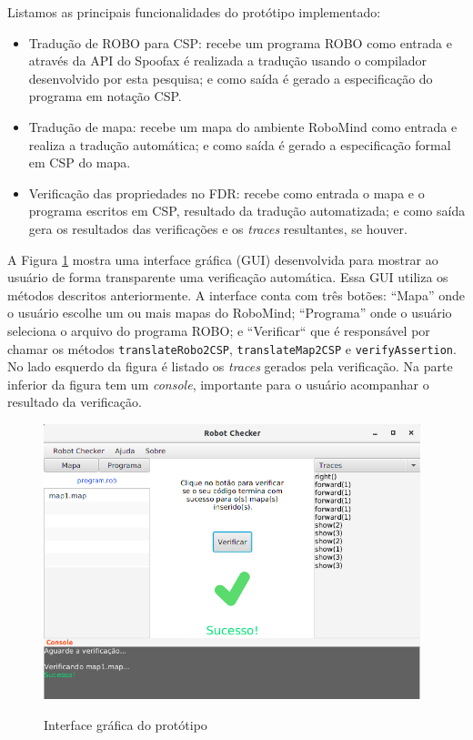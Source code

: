 Listamos as principais funcionalidades do protótipo implementado:

\begin{itemize}
    \item Tradução de ROBO para CSP: recebe um programa ROBO como entrada e através da API do Spoofax é realizada a tradução usando o compilador desenvolvido por esta pesquisa; e como saída é gerado a especificação do programa em notação CSP.
    \item Tradução de mapa: recebe um mapa do ambiente RoboMind como entrada e realiza a tradução automática; e como saída é gerado a especificação formal em CSP do mapa.
    \item Verificação das propriedades no FDR: recebe como entrada o mapa e o programa escritos em CSP, resultado da tradução automatizada; e como saída gera os resultados das verificações e os \textit{traces} resultantes, se houver.
\end{itemize}

A Figura \ref{fig:guiprot} mostra uma interface gráfica (GUI) desenvolvida para mostrar ao usuário de forma transparente uma verificação automática. Essa GUI utiliza os métodos descritos anteriormente. A interface conta com três botões: ``Mapa'' onde o usuário escolhe um ou mais mapas do RoboMind; ``Programa'' onde o usuário seleciona o arquivo do programa ROBO; e ``Verificar`` que é responsável por chamar os métodos \texttt{translateRobo2CSP}, \texttt{translateMap2CSP} e \texttt{verifyAssertion}. No lado esquerdo da figura é listado os \textit{traces} gerados pela verificação. Na parte inferior da figura tem um \textit{console}, importante para o usuário acompanhar o resultado da verificação.

\begin{figure}[!h]
\centering
\caption{Interface gráfica do protótipo}
\includegraphics[height=8cm]{figuras/prototipo.png}
\label{fig:guiprot}
\end{figure}

